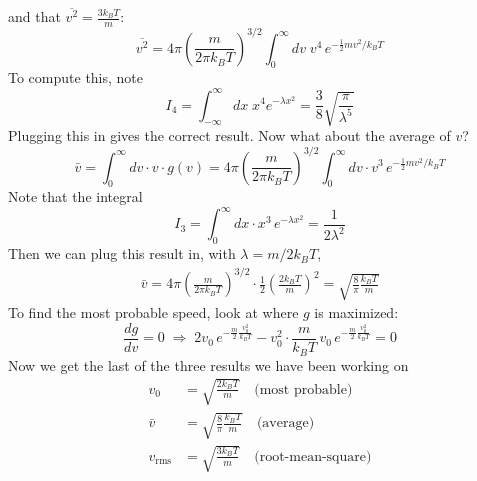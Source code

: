 \documentclass{report}
\numberwithin{equation}{section}
\begin{document}
and that $\overline{v^2} = \frac{3k_BT}{m}$:
\begin{equation*}
    \overline{v^2} = 4\pi\left(\frac{m}{2\pi k_BT}\right)^{3/2}\int^{\infty}_{0}dv\; v^4\, e^{-\frac{1}{2}mv^2/k_BT}
\end{equation*}
To compute this, note
\begin{equation*}
    I_4 = \int^{\infty}_{-\infty}dx\; x^4 e^{-\lambda x^2} = \frac{3}{8}\sqrt{\frac{\pi}{\lambda^5}}
\end{equation*}
Plugging this in gives the correct result. Now what about the average of $v$?
\begin{equation}
    \bar{v} = \int^{\infty}_{0}dv \cdot v \cdot g(v) = 4\pi\left(\frac{m}{2\pi k_BT}\right)^{3/2}\int^{\infty}_{0}dv\cdot v^3\, e^{-\frac{1}{2}mv^2/k_BT}
\end{equation}
Note that the integral
\begin{equation}
    I_3 = \int^{\infty}_{0} dx\cdot x^3\, e^{-\lambda x^2} = \frac{1}{2\lambda^2}
\end{equation}
Then we can plug this result in, with $\lambda = m/2k_BT$,
\begin{align*}
    \bar{v} = 4\pi\left(\frac{m}{2\pi k_BT}\right)^{3/2}\cdot\frac{1}{2}\left(\frac{2k_BT}{m}\right)^{2} = \sqrt{\frac{8}{\pi}\frac{k_BT}{m}}
\end{align*}
To find the most probable speed, look at where $g$ is maximized:
\begin{equation}
    \frac{dg}{dv} = 0 \;\Longrightarrow\; 2v_0\,e^{-\frac{m}{2}\frac{v_0^2}{k_BT}}-v_0^2\cdot\frac{m}{k_BT}\,v_0\,e^{-\frac{m}{2}\frac{v_0^2}{k_BT}} = 0
\end{equation}
Now we get the last of the three results we have been working on
\begin{align}
    v_0 &= \sqrt{\frac{2k_BT}{m}}\quad \text{(most probable)}\\
    \bar{v} &= \sqrt{\frac{8}{\pi}\frac{k_BT}{m}}\quad \text{(average)}\\
    v_{\text{rms}} &= \sqrt{\frac{3k_BT}{m}}\quad \text{(root-mean-square)}
\end{align}
\end{document}
